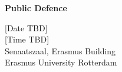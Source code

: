 \documentclass[../main.tex]{subfiles}
\begin{document}
\begin{center}
\vfill

{\large\bfseries Public Defence}

\vspace{0.3cm}

[Date TBD]\\[0.2cm]
[Time TBD]\\[0.2cm]
Senaatszaal, Erasmus Building\\
Erasmus University Rotterdam

\vspace{1cm}

\end{center}
\clearpage
\end{document}
